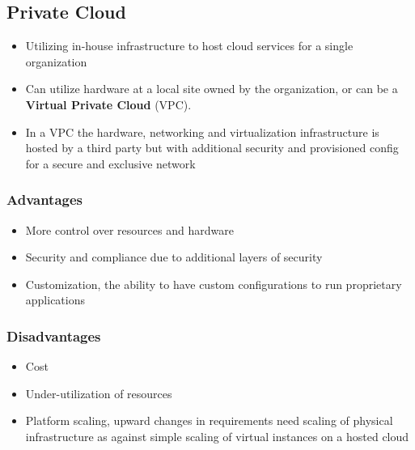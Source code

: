 \documentclass{article}
\begin{document}
\subsection{Private Cloud}
\begin{itemize}
    \item Utilizing in-house infrastructure to host cloud services for a single organization
    
    \item Can utilize hardware at a local site owned by the organization, or can be a \textbf{Virtual Private Cloud} (VPC).
    
    \item In a VPC the hardware, networking and virtualization infrastructure is hosted by a third party but with additional security and provisioned config for a secure and exclusive network
\end{itemize}

\subsubsection{Advantages}
\begin{itemize}
    \item More control over resources and hardware
    
    \item Security and compliance due to additional layers of security
    
    \item Customization, the ability to have custom configurations to run proprietary applications
\end{itemize}

\subsubsection{Disadvantages}
\begin{itemize}
    \item Cost
    
    \item Under-utilization of resources
    
    \item Platform scaling, upward changes in requirements need scaling of physical infrastructure as against simple scaling of virtual instances on a hosted cloud
\end{itemize}
\end{document}
